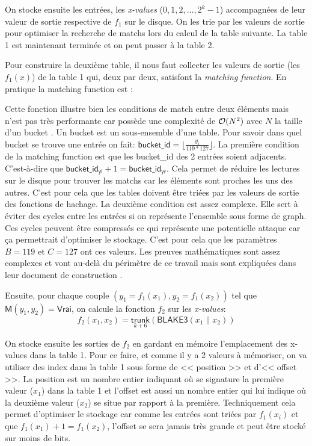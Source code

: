 On stocke ensuite les entrées, les \emph{x-values} ($0,1,2,\dots,2^k-1$) accompagnées de leur valeur de sortie respective de $f_1$ sur le disque. On les trie par les valeurs de sortie pour optimiser la recherche de matchs lors du calcul de la table suivante. La table 1 est maintenant terminée et on peut passer à la table 2.

Pour construire la deuxième table, il nous faut collecter les valeurs de sortie (les $f_1(x)$) de la table 1 qui, deux par deux, satisfont la \emph{matching function}. En pratique la matching function est :


Cette fonction illustre bien les conditions de match entre deux éléments mais n'est pas très performante car possède une complexité de $\mathcal{O}(N^2)$ avec $N$ la taille d'un bucket \cite{chiapos}. Un bucket est un sous-ensemble d'une table. Pour savoir dans quel bucket se trouve une entrée on fait: $\mathsf{bucket\_id} = \lfloor\frac{y_i}{119 * 127}\rfloor$. La première condition de la matching function est que les bucket\_id des 2 entrées soient adjacents. C'est-à-dire que $\mathsf{bucket\_id_{yl}} + 1 = \mathsf{bucket\_id_{yr}}$. Cela permet de réduire les lectures sur le disque pour trouver les matchs car les éléments sont proches les uns des autres. C'est pour cela que les tables doivent être triées par les valeurs de sortie des fonctions de hachage. La deuxième condition est assez complexe. Elle sert à éviter des cycles entre les entrées si on représente l'ensemble sous forme de graph. Ces cycles peuvent être compressés ce qui représente une potentielle attaque car ça permettrait d'optimiser le stockage. C'est pour cela que les paramètres $B = 119$ et $C = 127$ ont ces valeurs. Les preuves mathématiques sont assez complexes et vont au-delà du périmètre de ce travail mais sont expliquées dans leur document de construction \cite{chia:construction}.

Ensuite, pour chaque couple $(y_1=f_1(x_1), y_2=f_1(x_2))$ tel que $\textsf{M}(y_1, y_2) = \textsf{Vrai}$, on calcule la fonction $f_2$ sur les \emph{x-values}:
\begin{equation*}
  f_2(x_1,x_2) = \underset{k + 6}{\textsf{trunk}}(\textsf{BLAKE3}(x_1\|x_2))
\end{equation*}

On stocke ensuite les sorties de $f_2$ en gardant en mémoire l'emplacement des x-values dans la table 1. Pour ce faire, et comme il y a 2 valeurs à mémoriser, on va utiliser des index dans la table 1 sous forme de << position >> et d'<< offset >>. La position est un nombre entier indiquant où se signature la première valeur ($x_1$) dans la table 1 et l'offset est aussi un nombre entier qui lui indique où la deuxième valeur ($x_2$) se situe par rapport à la première. Techniquement cela permet d'optimiser le stockage car comme les entrées sont triées par $f_1(x_i)$ et que $f_1(x_1) + 1 = f_1(x_2)$, l'offset se sera jamais très grande et peut être stocké sur moins de bits. 

